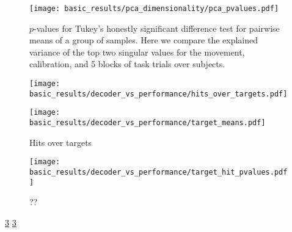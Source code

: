 \documentclass[../main.tex]{subfiles}
\begin{document}
\begin{figure}[H]
    \centering
    \texttt{[image: basic\_results/pca\_dimensionality/pca\_pvalues.pdf]}
    \caption[Explained variance Tukey test]{$p$-values for Tukey's honestly significant difference test for pairwise means of a group of samples. Here we compare the explained variance of the top two singular values for the movement, calibration, and 5 blocks of task trials over subjects.}\label{fig:pca_pvalues}
\end{figure}





\begin{figure}[H]
    \centering
    \begin{minipage}{0.49\textwidth}
        \texttt{[image: basic\_results/decoder\_vs\_performance/hits\_over\_targets.pdf]}
        \subcaption{}
    \end{minipage}
    \begin{minipage}{0.49\textwidth}
        \texttt{[image: basic\_results/decoder\_vs\_performance/target\_means.pdf]}
      \subcaption{}
    \end{minipage}
    \caption[Hits over targets]{Hits over targets}\label{fig:hits_over_targets}
\end{figure}


\begin{figure}[H]
    \centering
    \texttt{[image: basic\_results/decoder\_vs\_performance/target\_hit\_pvalues.pdf]}
    \caption[Target hit Tukey test]{??}\label{fig:target_hit_pvalues}
\end{figure}

\cref{fig:target_hit_pvalues}
\cref{fig:target_hit_pvalues}


% 
\end{document}
